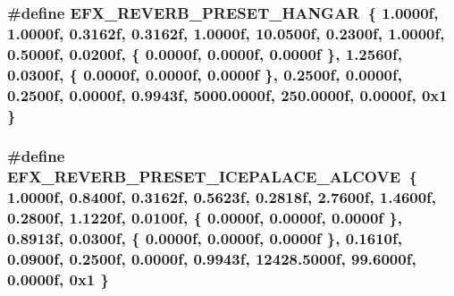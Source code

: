 \subsubsection[{\texorpdfstring{E\+F\+X\+\_\+\+R\+E\+V\+E\+R\+B\+\_\+\+P\+R\+E\+S\+E\+T\+\_\+\+H\+A\+N\+G\+AR}{EFX_REVERB_PRESET_HANGAR}}]{\setlength{\rightskip}{0pt plus 5cm}\#define E\+F\+X\+\_\+\+R\+E\+V\+E\+R\+B\+\_\+\+P\+R\+E\+S\+E\+T\+\_\+\+H\+A\+N\+G\+AR~\{ 1.\+0000f, 1.\+0000f, 0.\+3162f, 0.\+3162f, 1.\+0000f, 10.\+0500f, 0.\+2300f, 1.\+0000f, 0.\+5000f, 0.\+0200f, \{ 0.\+0000f, 0.\+0000f, 0.\+0000f \}, 1.\+2560f, 0.\+0300f, \{ 0.\+0000f, 0.\+0000f, 0.\+0000f \}, 0.\+2500f, 0.\+0000f, 0.\+2500f, 0.\+0000f, 0.\+9943f, 5000.\+0000f, 250.\+0000f, 0.\+0000f, 0x1 \}}\hypertarget{efx-presets_8h_a191cdef4e04feae0911f89da86fa1afe}{}\label{efx-presets_8h_a191cdef4e04feae0911f89da86fa1afe}
\subsubsection[{\texorpdfstring{E\+F\+X\+\_\+\+R\+E\+V\+E\+R\+B\+\_\+\+P\+R\+E\+S\+E\+T\+\_\+\+I\+C\+E\+P\+A\+L\+A\+C\+E\+\_\+\+A\+L\+C\+O\+VE}{EFX_REVERB_PRESET_ICEPALACE_ALCOVE}}]{\setlength{\rightskip}{0pt plus 5cm}\#define E\+F\+X\+\_\+\+R\+E\+V\+E\+R\+B\+\_\+\+P\+R\+E\+S\+E\+T\+\_\+\+I\+C\+E\+P\+A\+L\+A\+C\+E\+\_\+\+A\+L\+C\+O\+VE~\{ 1.\+0000f, 0.\+8400f, 0.\+3162f, 0.\+5623f, 0.\+2818f, 2.\+7600f, 1.\+4600f, 0.\+2800f, 1.\+1220f, 0.\+0100f, \{ 0.\+0000f, 0.\+0000f, 0.\+0000f \}, 0.\+8913f, 0.\+0300f, \{ 0.\+0000f, 0.\+0000f, 0.\+0000f \}, 0.\+1610f, 0.\+0900f, 0.\+2500f, 0.\+0000f, 0.\+9943f, 12428.\+5000f, 99.\+6000f, 0.\+0000f, 0x1 \}}\hypertarget{efx-presets_8h_ab735161bb3f91b845c66c6daacd30ef2}{}\label{efx-presets_8h_ab735161bb3f91b845c66c6daacd30ef2}
